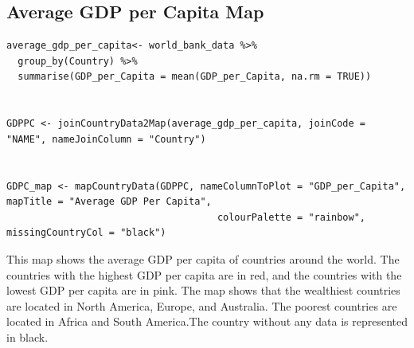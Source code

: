 \documentclass{article}\usepackage[]{graphicx}\usepackage[]{xcolor}
\begin{document}
\newpage
\subsection{Average GDP per Capita Map}
\begin{lstlisting}
average_gdp_per_capita<- world_bank_data %>%
  group_by(Country) %>%
  summarise(GDP_per_Capita = mean(GDP_per_Capita, na.rm = TRUE))


GDPPC <- joinCountryData2Map(average_gdp_per_capita, joinCode = "NAME", nameJoinColumn = "Country")


GDPC_map <- mapCountryData(GDPPC, nameColumnToPlot = "GDP_per_Capita", mapTitle = "Average GDP Per Capita", 
                                     colourPalette = "rainbow", missingCountryCol = "black")

\end{lstlisting}
This map shows the average GDP per capita of countries around the world. The countries with the highest GDP per capita are in red, and the countries with the lowest GDP per capita are in pink. The map shows that the wealthiest countries are located in North America, Europe, and Australia. The poorest countries are located in Africa and South America.The country without any data is represented in black.
\newpage
\end{document}
